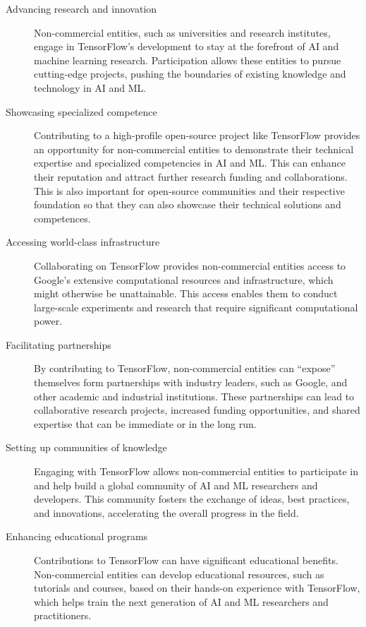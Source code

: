 \documentclass[CHICAGO,Times1COL]{WileyNJDv5} %
\begin{document}
\begin{description}
\item[Advancing research and innovation] Non-commercial entities, such as universities and research institutes, engage in TensorFlow's development to stay at the forefront of AI and machine learning research. Participation allows these entities to pursue cutting-edge projects, pushing the boundaries of existing knowledge and technology in AI and ML.

\item[Showcasing specialized competence] Contributing to a high-profile open-source project like TensorFlow provides an opportunity for non-commercial entities to demonstrate their technical expertise and specialized competencies in AI and ML. This can enhance their reputation and attract further research funding and collaborations. This is also important for open-source communities and their respective foundation so that they can also showcase their technical solutions and competences. 

\item[Accessing world-class infrastructure] Collaborating on TensorFlow provides non-commercial entities access to Google's extensive computational resources and infrastructure, which might otherwise be unattainable. This access enables them to conduct large-scale experiments and research that require significant computational power.

\item[Facilitating partnerships] By contributing to TensorFlow, non-commercial entities can ``expose'' themselves form partnerships with industry leaders, such as Google, and other academic and industrial institutions. These partnerships can lead to collaborative research projects, increased funding opportunities, and shared expertise that can be immediate or in the long run. 

\item[Setting up communities of knowledge] Engaging with TensorFlow allows non-commercial entities to participate in and help build a global community of AI and ML researchers and developers. This community fosters the exchange of ideas, best practices, and innovations, accelerating the overall progress in the field.

\item[Enhancing educational programs] Contributions to TensorFlow can have significant educational benefits. Non-commercial entities can develop educational resources, such as tutorials and courses, based on their hands-on experience with TensorFlow, which helps train the next generation of AI and ML researchers and practitioners.


\end{description}
\end{document}

